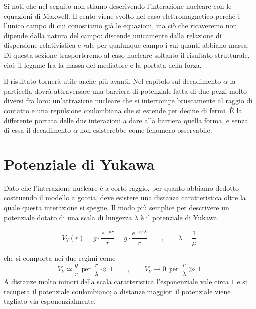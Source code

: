 Si noti che nel seguito non stiamo descrivendo l'interazione nucleare con le equazioni di Maxwell. Il conto viene svolto nel caso elettromagnetico perché è l'unico campo di cui conosciamo già le equazioni, ma ciò che ricaveremo non dipende dalla natura del campo: discende unicamente dalla relazione di dispersione relativistica e vale per qualunque campo i cui quanti abbiano massa. Di questa sezione trasporteremo al caso nucleare soltanto il risultato strutturale, cioè il legame fra la massa del mediatore e la portata della forza.

Il risultato tornerà utile anche più avanti. Nel capitolo sul decadimento $\alpha$ la particella dovrà attraversare una barriera di potenziale fatta di due pezzi molto diversi fra loro: un'attrazione nucleare che si interrompe bruscamente al raggio di contatto e una repulsione coulombiana che si estende per decine di fermi. È la differente portata delle due interazioni a dare alla barriera quella forma, e senza di essa il decadimento $\alpha$ non esisterebbe come fenomeno osservabile.

\section{Potenziale di Yukawa}

Dato che l'interazione nucleare è a corto raggio, per quanto abbiamo dedotto costruendo il modello a goccia, deve esistere una distanza caratteristica oltre la quale questa interazione si spegne. Il modo più semplice per descrivere un potenziale dotato di una scala di lungezza $\lambda$ è il potenziale di Yukawa.
%
\begin{tcolorbox}[colback=black!5!white, colframe=black!45!white, boxrule=0.8pt]
\begin{equation}
    V_Y(r) = g \cdot \frac{e^{-\mu r}}{r} = g \cdot \frac{e^{-r/\lambda}}{r} \qquad , \qquad \lambda = \frac{1}{\mu}
    \label{eq:yukawa}
\end{equation}
\end{tcolorbox}
che si comporta nei due regimi come
%
\begin{equation*}
    V_Y \simeq \frac{g}{r} \ \ \text{per} \ \ \frac{r}{\lambda} \ll 1 \qquad , \qquad V_Y \to 0 \ \ \text{per} \ \ \frac{r}{\lambda} \gg 1
\end{equation*}
A distanze molto minori della scala caratteristica l'esponenziale vale circa $1$ e si recupera il potenziale coulombiano; a distanze maggiori il potenziale viene tagliato via esponenzialmente.

